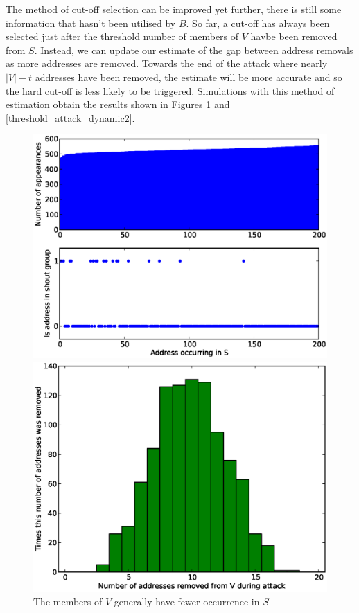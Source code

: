 \documentclass[ %
                    author={Luke Murray},
                supervisor={Dr. Simon Hollis},
                     title={Shadow Peer-to-Peer Networks},
                  subtitle={},
                    degree={MEng},
                      year={2013} ]{thesis}
\begin{document}
The method of cut-off selection can be improved yet further, there is still some information that hasn't been utilised by $B$. So far, a cut-off has always been selected just after the threshold number of members of $V$ havbe been removed from $S$. Instead, we can update our estimate of the gap between address removals as more addresses are removed. Towards the end of the attack where nearly $|V| - t$ addresses have been removed, the estimate will be more accurate and so the hard cut-off is less likely to be triggered. Simulations with this method of estimation obtain the results shown in Figures \ref{threshold_attack_dynamic1} and \ref{threshold_attack_dynamic2}.
 
\begin{figure}[h]
    \centering
    \begin{minipage}[b]{0.4\linewidth}
        \centering
        \includegraphics[width=\linewidth]{diagrams/dyn1.eps}
        \caption{The members of $V$ generally have fewer occurrence in $S$}
        \label{threshold_attack_dynamic1}
    \end{minipage}
    \hspace{0.5cm}
    \begin{minipage}[b]{0.4\linewidth}
        \centering
        \includegraphics[width=\linewidth]{diagrams/dyn2.eps}

\end{minipage}
\end{figure}
\end{document}
